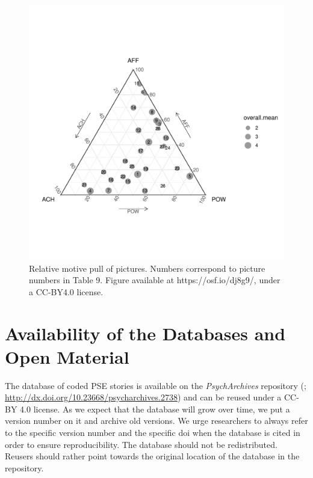 \documentclass[jou,a4paper]{apa6}\usepackage[]{graphicx}\usepackage[]{color}
\newenvironment{knitrout}{}{} %
\begin{document}
\begin{knitrout}
\color{fgcolor}\begin{figure}

{\centering \includegraphics[width=.9\textwidth]{figure/ternary-1} 

}

\caption[Relative motive pull of pictures]{Relative motive pull of pictures. Numbers correspond to picture numbers in Table 9. Figure available at https://osf.io/dj8g9/, under a CC-BY4.0 license.}\label{fig:ternary}
\end{figure}


\end{knitrout}

\section{Availability of the Databases and Open Material}

The database of coded PSE stories is available on the \emph{PsychArchives} repository (; \url{http://dx.doi.org/10.23668/psycharchives.2738}) and can be reused under a CC-BY 4.0 license. As we expect that the database will grow over time, we put a version number on it and archive old versions. We urge researchers to always refer to the specific version number and the specific doi when the database is cited in order to ensure reproducibility. The database should not be redistributed. Reusers should rather point towards the original location of the database in the repository.
\end{document}
